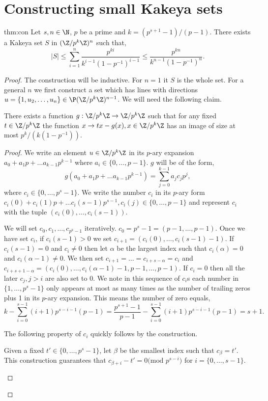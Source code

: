 \section{Constructing small Kakeya sets}\label{sec:const}
\begin{repthm}{thm:con}
Let $s,n\in \N$, $p$ be a prime and $k=(p^{s+1}-1)/(p-1)$. There exists a Kakeya set $S$ in $(\Z/p^k\Z)^n$ such that,
$$|S| \le \sum\limits_{i=1}^n \frac{p^{ki}}{k^{i-1}(1-p^{-1})^{i-1}}\le \frac{p^{kn}}{k^{n-1}(1-p^{-1})^{n}}.$$
\end{repthm}
\begin{proof}
The construction will be inductive. For $n=1$ it $S$ is the whole set.
For a general $n$ we first construct a set which has lines with directions $u=\{1,u_2,\hdots,u_n\}\in \P (\Z/p^k\Z)^{n-1}$. We will need the following claim.
\begin{claim}
There exists a function $g: \Z/p^k\Z\rightarrow \Z/p^k\Z$ such that for any fixed $t\in \Z/p^k\Z$ the function $x\rightarrow tx-g(x),x\in \Z/p^k\Z$ has an image of size at most $p^k/(k(1-p^{-1}))$.
\end{claim}
\begin{proof}
We write an element $u\in \Z/p^k\Z$ in its $p$-ary expansion $a_0+a_1p+\hdots a_{k-1}p^{k-1}$ where $a_i\in \{0,\hdots,p-1\}$. $g$ will be of the form,
$$g(a_0+a_1p+\hdots a_{k-1}p^{k-1})=\sum\limits_{j=0}^{k-1} a_jc_jp^j,$$
where $c_i \in \{0,\hdots, p^s-1\}$. We write the number $c_i$ in its $p$-ary form $c_i(0)+c_i(1)p+\hdots c_i(s-1)p^{s-1}, c_i(j)\in \{0,\hdots, p-1\}$ and represent $c_i$ with the tuple $(c_i(0),\hdots,c_i(s-1))$. 

We will set $c_0,c_1,\hdots,c_{p^k-1}$ iteratively. $c_0=p^s-1=(p-1,\hdots,p-1)$. Once we have set $c_i$, if $c_i(s-1)>0$ we set $c_{i+1}=(c_i(0),\hdots,c_i(s-1)-1)$. If $c_i(s-1)=0$ and $c_i\ne 0$ then let $\alpha$ be the largest index such that $c_i(\alpha)=0$ and $c_{i}(\alpha-1)\ne 0$. We then set $c_{i+1}=\hdots=c_{i+s-\alpha}=c_i$ and $c_{i+s+1-\alpha}=(c_i(0),\hdots,c_i(\alpha-1)-1,p-1,\hdots,p-1)$. If $c_i=0$ then all the later $c_j,j>i$ are also set to $0$.  We note in this sequence of $c_i$s each number in $\{1,\hdots, p^s-1\}$ only appears at most as many times as the number of trailing zeros plus 1 in its $p$-ary expansion. This means the number of zero equals,
$$k-\sum\limits_{i=0}^{s-1} (i+1)p^{s-i-1}(p-1)= \frac{p^{s+1}-1}{p-1}-\sum\limits_{i=0}^{s-1} (i+1)p^{s-i-1}(p-1)=s+1.$$

The following property of $c_i$ quickly follows by the construction.
\begin{stat}\label{stat:Ex}
Given a fixed $t'\in \{0,\hdots,p^s-1\}$, let $\beta$ be the smallest index such that $c_\beta=t'$. This construction guarantees that {\em $c_{\beta+i}-t'=0\text{(mod }p^{s-i}\text{)}$} for $i=\{0,\hdots,s-1\}$.


\end{stat}
\end{proof}
\end{proof}
